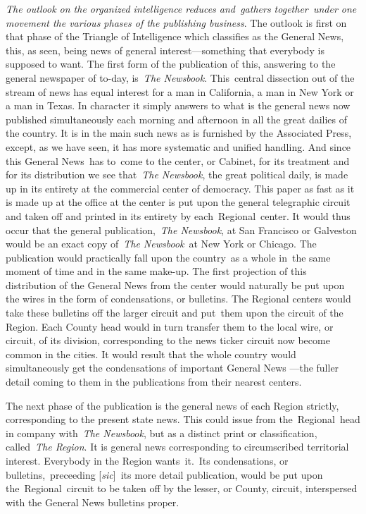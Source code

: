\documentclass[twoside,symmetric,nobib,justified]{tufte-book}
\begin{document}
\emph{The outlook on the organized intelligence reduces and~gathers
together~under one movement the various phases of the publishing
business}. The outlook is first on that phase of the Triangle of
Intelligence which classifies as the General News, this, as seen, being
news of general interest---something that everybody is supposed to want.
The first form of the publication of this, answering to the general
newspaper of to-day, is~\emph{The Newsbook}. This~central dissection out
of the stream of news has equal interest for a man in California, a man
in New York or a man in Texas. In character it simply answers to what is
the general news now published simultaneously each morning and afternoon
in all the great dailies of the country. It is in the main such news as
is furnished by the Associated Press, except, as we have seen, it has
more systematic and unified handling. And since this General News~has
to~come to the center, or Cabinet, for its treatment and for its
distribution we see that~\emph{The Newsbook}, the great political daily,
is made up in its entirety at the commercial center of democracy. This
paper as fast as it is made up at the office at the center is put upon
the general telegraphic circuit and taken off and printed in its
entirety by each~Regional~center. It would thus occur that the general
publication,~\emph{The Newsbook}, at San Francisco or Galveston would be
an exact copy of~\emph{The Newsbook}~at New York or Chicago. The
publication would practically fall upon the country~as a whole in~the
same moment of time and in the same make-up. The first projection of
this distribution of the General News from the center would naturally be
put upon the wires in the form of condensations, or bulletins. The
Regional centers would take these bulletins off the larger circuit and
put~them upon the circuit of the Region. Each County head would in turn
transfer them to the local wire, or circuit, of its division,
corresponding to the news ticker circuit now become common in the
cities. It would result that the whole country would simultaneously get
the condensations of important General News ---the fuller detail coming
to them in the publications from their nearest centers.~

The next phase of the publication is the general news of each Region
strictly, corresponding to the present state news. This could issue from
the~Regional~head in company with~\emph{The Newsbook}, but as a distinct
print or classification, called~\emph{The Region}. It is general news
corresponding to circumscribed territorial interest. Everybody in the
Region wants~it.~Its condensations, or bulletins,~preceeding
{[}\emph{sic}{]}~its more detail publication, would be put upon
the~Regional~circuit to be taken off by the lesser, or County, circuit,
interspersed with the General News bulletins proper.~
\end{document}
